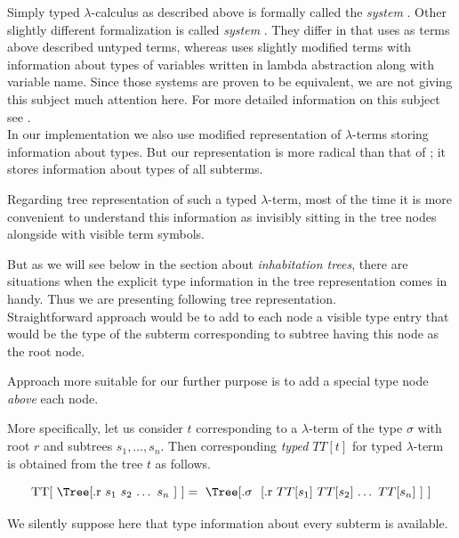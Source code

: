 \documentclass[12pt,a4paper]{report}
\newcommand{\lets}{let us\xspace}
\newcommand{\lterm}{$\lambda$-term\xspace}
\newcommand{\lterms}{$\lambda$-terms\xspace}
\begin{document}
Simply typed $\lambda$-calculus as described above is formally
called the \textit{system \lsCurry}. 
Other slightly different formalization is called 
\textit{system \lsChurch}. 
They differ in that \lsCurry uses as terms above described
untyped terms, whereas \lsChurch uses slightly modified
terms with information about types of variables written in
lambda abstraction along with variable name.
Since those systems are proven to be equivalent,
we are not giving this subject much attention here.
For more detailed information on this subject see \cite{barendregt92}.\\

In our implementation we also use modified representation of \lterms
storing information about types. But our representation is more 
radical than that of \lsChurch; it stores information about types
of all subterms.

Regarding tree representation of such a typed
\lterm, most of the time it is more convenient to 
understand this information as invisibly sitting
in the tree nodes alongside with visible
term symbols.

But as we will see below in the section about \textit{inhabitation trees},
there are situations when the explicit type information in the tree representation
comes in handy. Thus we are presenting following tree representation.\\


Straightforward approach would be to add to each node a visible type entry 
that would be the type of the subterm corresponding to subtree having this
node as the root node. 

Approach more suitable for our further purpose 
is to add a special type node \textit{above} each node.

More specifically,
\lets consider \textit{\sexprTree} $t$ corresponding to a \lterm of the type
$\sigma$ with root $r$ and subtrees $s_1 , \dots , s_n$. 
Then corresponding \textit{typed \sexprTree} $TT[t]$ for typed \lterm is 
obtained from the tree $t$ as follows.  

\begin{equation*}
\mbox{ 
TT[ 
\Tree
	[.r 	
	  	  \text{$s_1$}
		  \text{$s_2$}
		  \text{$\dots$}
		  \text{$s_n$}
	] 
]} =
\mbox{
\Tree
	[.\text{$\sigma$ }
	    [.r 	
	  	  \text{$TT[s_1]$}
		  \text{$TT[s_2]$}
		  \text{$\dots$}
		  \text{$TT[s_n]$}
		]	  	
	] 
}
\end{equation*}

We silently suppose here that type information about every subterm is available.
\end{document}
